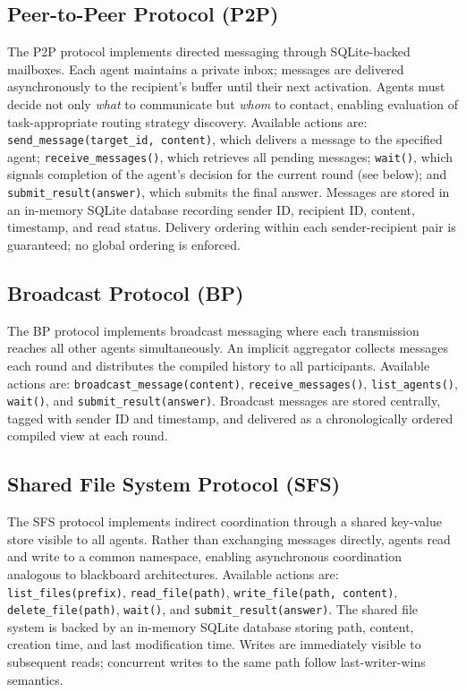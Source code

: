\subsection{Peer-to-Peer Protocol (P2P)}
\label{app:p2p}

The P2P protocol implements directed messaging through SQLite-backed mailboxes. Each agent maintains a private inbox; messages are delivered asynchronously to the recipient's buffer until their next activation. Agents must decide not only \textit{what} to communicate but \textit{whom} to contact, enabling evaluation of task-appropriate routing strategy discovery. Available actions are: \texttt{send\_message(target\_id, content)}, which delivers a message to the specified agent; \texttt{receive\_messages()}, which retrieves all pending messages; \texttt{wait()}, which signals completion of the agent's decision for the current round (see below); and \texttt{submit\_result(answer)}, which submits the final answer. Messages are stored in an in-memory SQLite database recording sender ID, recipient ID, content, timestamp, and read status. Delivery ordering within each sender-recipient pair is guaranteed; no global ordering is enforced.

\subsection{Broadcast Protocol (BP)}
\label{app:BP}

The BP protocol implements broadcast messaging where each transmission reaches all other agents simultaneously. An implicit aggregator collects messages each round and distributes the compiled history to all participants. Available actions are: \texttt{broadcast\_message(content)}, \texttt{receive\_messages()}, \texttt{list\_agents()}, \texttt{wait()}, and \texttt{submit\_result(answer)}. Broadcast messages are stored centrally, tagged with sender ID and timestamp, and delivered as a chronologically ordered compiled view at each round.

\subsection{Shared File System Protocol (SFS)}
\label{app:sfs}

The SFS protocol implements indirect coordination through a shared key-value store visible to all agents. Rather than exchanging messages directly, agents read and write to a common namespace, enabling asynchronous coordination analogous to blackboard architectures. Available actions are: \texttt{list\_files(prefix)}, \texttt{read\_file(path)}, \texttt{write\_file(path, content)}, \texttt{delete\_file(path)}, \texttt{wait()}, and \texttt{submit\_result(answer)}. The shared file system is backed by an in-memory SQLite database storing path, content, creation time, and last modification time. Writes are immediately visible to subsequent reads; concurrent writes to the same path follow last-writer-wins semantics.

